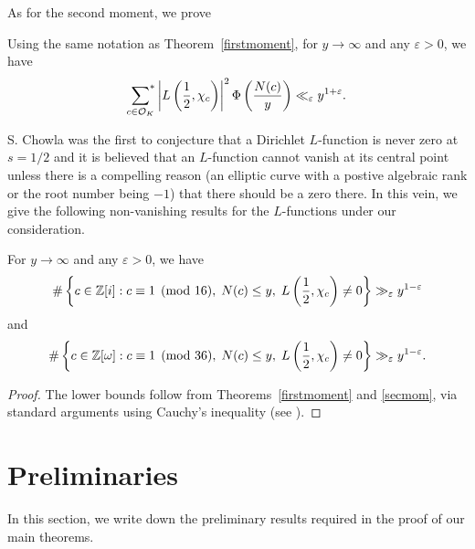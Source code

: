 \documentclass[twoside,leqno,10pt, A4]{amsart}
\begin{document}
 As for the second moment, we prove
\begin{theorem} \label{secmom}
Using the same notation as Theorem~\ref{firstmoment},  for $y \rightarrow \infty$ and any $\varepsilon > 0$, we have
\begin{equation*} \label{2ndmom}
   \sideset{}{^*}\sum_{c \in \mathcal{O}_K} \left| L \left( \frac{1}{2},
   \chi_c \right) \right|^2\Phi \left(  \frac{N(c)}{y} \right) \ll_{\varepsilon} y^{1+\varepsilon}.
\end{equation*}
\end{theorem}

S. Chowla \cite{chow} was the first to conjecture that a Dirichlet $L$-function is never zero at $s=1/2$ and it is believed that an $L$-function cannot vanish at its central point unless there is a compelling reason (an elliptic curve with a postive algebraic rank or the root number being $-1$) that there should be a zero there.  In this vein, we give the following non-vanishing results for the $L$-functions under our consideration.

\begin{corollary}
  For $y \rightarrow \infty$ and any $\varepsilon > 0$, we have
\[    \# \left\{ c \in \mathbb Z[i] : c \equiv 1 \pmod {16}, \; N(c) \leq y, \; L\left( \frac{1}{2}, \chi_c \right) \neq 0 \right\} \gg_{\varepsilon}
   y^{1-\varepsilon} \]
and
\[    \# \left\{ c \in \mathbb Z[\omega] : c \equiv 1 \pmod {36}, \; N(c) \leq y, \; L\left( \frac{1}{2}, \chi_c \right) \neq 0 \right\} \gg_{\varepsilon}
   y^{1-\varepsilon} . \]
\end{corollary}

\begin{proof}
The lower bounds follow from Theorems~\ref{firstmoment} and \ref{secmom}, via standard arguments using Cauchy's inequality (see \cite{Luo}).\end{proof}

\section{Preliminaries}
\label{sec 2}

In this section, we write down the preliminary results required in the proof of our main theorems.

\end{document}
